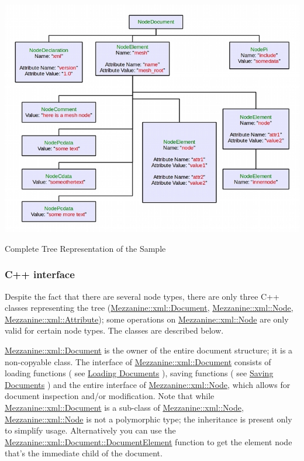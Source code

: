 \begin{DoxyItemize}
\begin{DoxyImage}
\includegraphics{SampleTree.jpg}
\caption{Complete Tree Representation of the Sample}
\end{DoxyImage}
  
\end{DoxyItemize}\hypertarget{XMLManual_XMLInterface}{}\subsubsection{C++ interface}\label{XMLManual_XMLInterface}
Despite the fact that there are several node types, there are only three C++ classes representing the tree (\hyperlink{classMezzanine_1_1xml_1_1Document}{Mezzanine::xml::Document}, \hyperlink{classMezzanine_1_1xml_1_1Node}{Mezzanine::xml::Node}, \hyperlink{classMezzanine_1_1xml_1_1Attribute}{Mezzanine::xml::Attribute}); some operations on \hyperlink{classMezzanine_1_1xml_1_1Node}{Mezzanine::xml::Node} are only valid for certain node types. The classes are described below. \par
 \par
 \hyperlink{classMezzanine_1_1xml_1_1Document}{Mezzanine::xml::Document} is the owner of the entire document structure; it is a non-\/copyable class. The interface of \hyperlink{classMezzanine_1_1xml_1_1Document}{Mezzanine::xml::Document} consists of loading functions ( see \hyperlink{XMLManual_XMLLoading}{Loading Documents} ), saving functions ( see \hyperlink{XMLManual_XMLSaving}{Saving Documents} ) and the entire interface of \hyperlink{classMezzanine_1_1xml_1_1Node}{Mezzanine::xml::Node}, which allows for document inspection and/or modification. Note that while \hyperlink{classMezzanine_1_1xml_1_1Document}{Mezzanine::xml::Document} is a sub-\/class of \hyperlink{classMezzanine_1_1xml_1_1Node}{Mezzanine::xml::Node}, \hyperlink{classMezzanine_1_1xml_1_1Node}{Mezzanine::xml::Node} is not a polymorphic type; the inheritance is present only to simplify usage. Alternatively you can use the \hyperlink{classMezzanine_1_1xml_1_1Document_a9a716897cbc2f97cf45a27614bcc1ae2}{Mezzanine::xml::Document::DocumentElement} function to get the element node that's the immediate child of the document. \par
